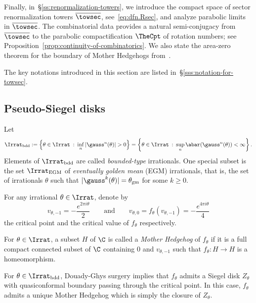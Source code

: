 \documentclass{amsart}
\begin{document}
Finally, in~\S\ref{ss:renormalization-towers}, we introduce the compact space of sector renormalization towers $\overline{\towsec}$, see~\eqref{eq:dfn.Rsec}, and analyze parabolic limits in $\overline{\towsec}$. 
The combinatorial data provides a natural semi-conjugacy from $\overline{\towsec}$ to the parabolic compactification $\TheCpt$ of rotation numbers; see Proposition~\ref{prop:continuity-of-combinatorics}. 
We also state the area-zero theorem for the boundary of Mother Hedgehogs from~\cite{Lim26b}.

The key notations introduced in this section are listed in~\S\ref{sss:notation-for-towsec}.





\subsection{Pseudo-Siegel disks} 
\label{ss:pseudo-siegel}

Let
\[
    \Irrat_{\text{bdd}} := 
    \left\{ \theta \in \Irrat \: : \: \inf_n |\gauss^n(\theta)| > 0 \right\}
    = 
    \left\{ \theta \in \Irrat \: : \: \sup_n \abar(\gauss^n(\theta)) < \infty \right\}.
\]
Elements of $\Irrat_{\text{bdd}}$ are called \emph{bounded-type} irrationals. 
One special subset is the set $\Irrat_{\text{EGM}}$ of \emph{eventually golden mean} (EGM) irrationals, that is, the set of irrationals $\theta$ such that  $|\gauss^k(\theta)| = \theta_{\text{gm}}$ for some $k \geq 0$.

For any irrational $\theta \in \Irrat$, denote by 
\[
v_{\theta,-1}=-\frac{e^{2\pi i \theta}}{2}
\qquad \text{and} \qquad
v_{\theta,0} = f_{\theta}(v_{\theta,-1}) = -\frac{e^{4\pi i \theta}}{4}
\]
the critical point and the critical value of $f_\theta$ respectively.

\begin{definition}
    For $\theta \in \Irrat$, a subset $H$ of $\C$ is called a \emph{Mother Hedgehog} of $f_\theta$ if it is a full compact connected subset of $\C$ containing $0$ and $v_{\theta,-1}$ such that $f_\theta: H \to H$ is a homeomorphism.
\end{definition}

For $\theta \in \Irrat_{\text{bdd}}$, Douady-Ghys surgery \cite{D87,G84} implies that $f_\theta$ admits a Siegel disk $Z_\theta$ with quasiconformal boundary passing through the critical point. In this case, $f_\theta$ admits a unique Mother Hedgehog which is simply the closure of $Z_\theta$.
\end{document}

